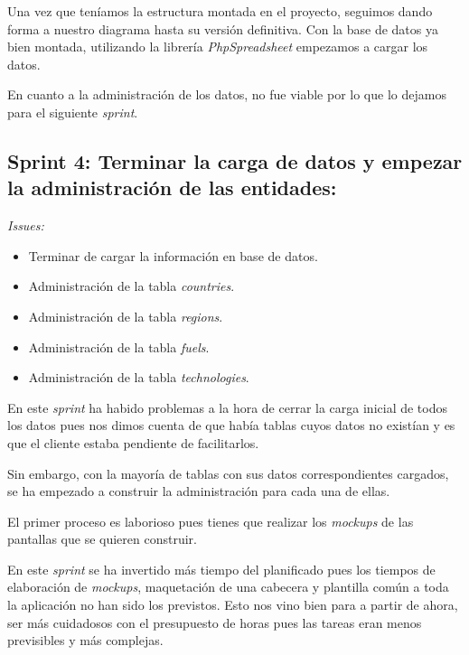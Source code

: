 Una vez que teníamos la estructura montada en el proyecto, seguimos dando forma a nuestro diagrama hasta su versión definitiva. Con la base de datos ya bien montada, utilizando la librería \textit{PhpSpreadsheet} empezamos a cargar los datos.

En cuanto a la administración de los datos, no fue viable por lo que lo dejamos para el siguiente \textit{sprint}.

\subsection{Sprint 4: Terminar la carga de datos y empezar la administración de las entidades:}
\textit{Issues:}
\begin{itemize}
	\item Terminar de cargar la información en base de datos.
	\item Administración de la tabla \textit{countries}.
	\item Administración de la tabla \textit{regions}.
	\item Administración de la tabla \textit{fuels}.
	\item Administración de la tabla \textit{technologies}.
\end{itemize}

En este \textit{sprint} ha habido problemas a la hora de cerrar la carga inicial de todos los datos pues nos dimos cuenta de que había tablas cuyos datos no existían y es que el cliente estaba pendiente de facilitarlos.

Sin embargo, con la mayoría de tablas con sus datos correspondientes cargados, se ha empezado a construir la administración para cada una de ellas. 

El primer proceso es laborioso pues tienes que realizar los \textit{mockups} de las pantallas que se quieren construir. 

En este \textit{sprint} se ha invertido más tiempo del planificado pues los tiempos de elaboración de \textit{mockups}, maquetación de una cabecera y plantilla común a toda la aplicación no han sido los previstos. Esto nos vino bien para a partir de ahora, ser más cuidadosos con el presupuesto de horas pues las tareas eran menos previsibles y más complejas.

